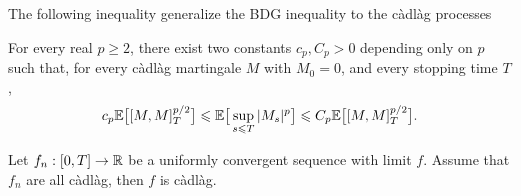 \documentclass[8pt,onesided]{article}
\begin{document}


 The following inequality generalize the BDG inequality to the càdlàg processes

\begin{theorem}
     \label{bdgg}
    For every real $p\ge 2$, there exist two constants $c_p, C_p>0$ depending only on $p$ such that, for every càdlàg martingale $M$ with $M_0=0$, and every stopping time $T$,
    \begin{equation*}
        c_p\mathbb{E} \big[[M,M]_{T}^{p/2} \big]\leqslant \mathbb{E}\big[\sup_{s\leqslant T}|M_s|^p\big]\leqslant C_p \mathbb{E}\big[[M,M]_T^{p/2}\big].
        \end{equation*}
\end{theorem}

\begin{theorem}
 \label{ucd}Let $f_n:[0,T]\to \mathbb{R}$ be a uniformly convergent sequence with limit $f$. Assume that $f_n$ are all càdlàg, then $f$ is càdlàg.
\end{theorem}
\end{document}
